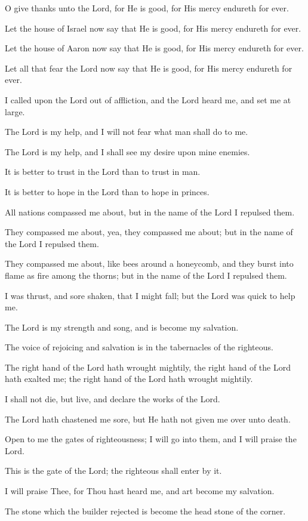 O give thanks unto the Lord, for He is good, for His mercy endureth for ever.

Let the house of Israel now say that He is good, for His mercy endureth for ever.

Let the house of Aaron now say that He is good, for His mercy endureth for ever.

Let all that fear the Lord now say that He is good, for His mercy endureth for ever.

I called upon the Lord out of affliction, and the Lord heard me, and set me at large.

The Lord is my help, and I will not fear what man shall do to me.

The Lord is my help, and I shall see my desire upon mine enemies.

It is better to trust in the Lord than to trust in man.

It is better to hope in the Lord than to hope in princes.

All nations compassed me about, but in the name of the Lord I repulsed them.

They compassed me about, yea, they compassed me about; but in the name of the Lord I repulsed them.

They compassed me about, like bees around a honeycomb, and they burst into flame as fire among the thorns; but in the name of the Lord I repulsed them.

I was thrust, and sore shaken, that I might fall; but the Lord was quick to help me.

The Lord is my strength and song, and is become my salvation.

The voice of rejoicing and salvation is in the tabernacles of the righteous.

The right hand of the Lord hath wrought mightily, the right hand of the Lord hath exalted me; the right hand of the Lord hath wrought mightily.

I shall not die, but live, and declare the works of the Lord.

The Lord hath chastened me sore, but He hath not given me over unto death.

Open to me the gates of righteousness; I will go into them, and I will praise the Lord.

This is the gate of the Lord; the righteous shall enter by it.

I will praise Thee, for Thou hast heard me, and art become my salvation.

The stone which the builder rejected is become the head stone of the corner.

